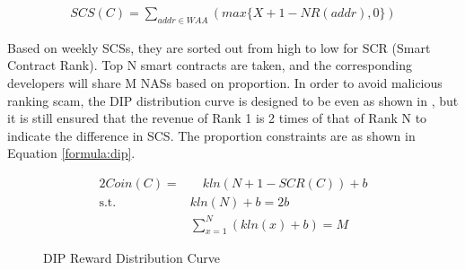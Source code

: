 
\begin{align}
\label{formula:dip:scs}
SCS(C)=\sum_{addr \in WAA}(max\{X + 1 - NR(addr), 0\})
\end{align}

Based on weekly SCSs, they are sorted out from high to low for SCR (Smart Contract Rank). Top N smart contracts are taken, and the corresponding developers will share M NASs based on proportion. In order to avoid malicious ranking scam, the DIP distribution curve is designed to be even as shown in , but it is still ensured that the revenue of Rank 1 is 2 times of that of Rank N to indicate the difference in SCS. The proportion constraints are as shown in Equation \ref{formula:dip}.


\begin{alignat}{2}
Coin(C) = & \quad kln(N+1-SCR(C))+b \label{formula:dip} \\
\mbox{s.t.}\quad & kln(N) + b = 2b \nonumber \\
& \sum_{x=1}^{N}(kln(x) + b) = M \nonumber
\end{alignat}

\begin{figure}[h]
\centering
{}
\caption{DIP Reward Distribution Curve}
\label{fig:dipdis}
\end{figure}

